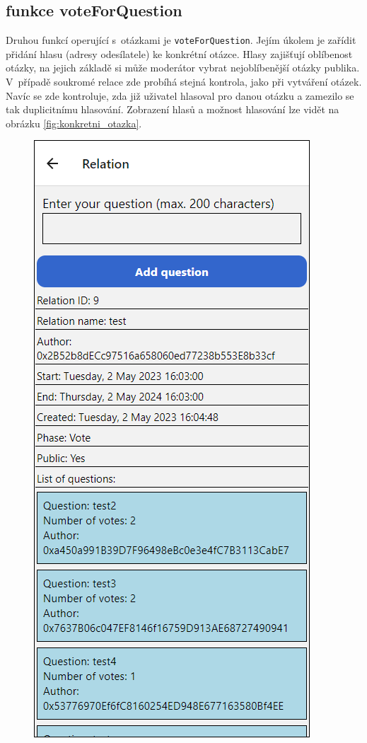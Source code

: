 \subsection*{funkce voteForQuestion}
Druhou funkcí operující s~otázkami je \texttt{voteForQuestion}. Jejím úkolem je zařídit přidání hlasu (adresy odesílatele) ke konkrétní otázce. Hlasy zajišťují oblíbenost otázky, na jejich základě si může moderátor vybrat nejoblíbenější otázky publika. V~případě soukromé relace zde probíhá stejná kontrola, jako při vytváření otázek. Navíc se zde kontroluje, zda již uživatel hlasoval pro danou otázku a zamezilo se tak duplicitnímu hlasování. Zobrazení hlasů a možnost hlasování lze vidět na obrázku \ref{fig:konkretni_otazka}.
\begin{figure}
\centering
\begin{minipage}{.5\textwidth}
  \centering
  \includegraphics[width=.9\linewidth]{obrazky/relace_s_otazkami.png}

\end{minipage}
\end{figure}
